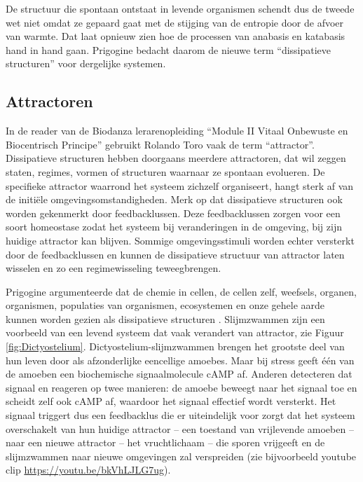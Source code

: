 \documentclass[
  11pt,
]{book}
\begin{document}
De structuur die spontaan ontstaat in levende organismen schendt dus de tweede wet niet omdat ze gepaard gaat met de stijging van de entropie door de afvoer van warmte. Dat laat opnieuw zien hoe de processen van anabasis en katabasis hand in hand gaan. Prigogine bedacht daarom de nieuwe term ``dissipatieve structuren'' voor dergelijke systemen.

\subsection{Attractoren}\label{attractoren}

In de reader van de Biodanza lerarenopleiding ``Module II Vitaal Onbewuste en Biocentrisch Principe'' gebruikt Rolando Toro vaak de term ``attractor''. Dissipatieve structuren hebben doorgaans meerdere attractoren, dat wil zeggen staten, regimes, vormen of structuren waarnaar ze spontaan evolueren. De specifieke attractor waarrond het systeem zichzelf organiseert, hangt sterk af van de initiële omgevingsomstandigheden. Merk op dat dissipatieve structuren ook worden gekenmerkt door feedbacklussen. Deze feedbacklussen zorgen voor een soort homeostase zodat het systeem bij veranderingen in de omgeving, bij zijn huidige attractor kan blijven. Sommige omgevingsstimuli worden echter versterkt door de feedbacklussen en kunnen de dissipatieve structuur van attractor laten wisselen en zo een regimewisseling teweegbrengen.

Prigogine argumenteerde dat de chemie in cellen, de cellen zelf, weefsels, organen, organismen, populaties van organismen, ecosystemen en onze gehele aarde kunnen worden gezien als dissipatieve structuren \citep{prigogineStengers1984}.
Slijmzwammen zijn een voorbeeld van een levend systeem dat vaak verandert van attractor, zie Figuur \ref{fig:Dictyostelium}. Dictyostelium-slijmzwammen brengen het grootste deel van hun leven door als afzonderlijke eencellige amoebes. Maar bij stress geeft één van de amoeben een biochemische signaalmolecule cAMP af. Anderen detecteren dat signaal en reageren op twee manieren: de amoebe beweegt naar het signaal toe en scheidt zelf ook cAMP af, waardoor het signaal effectief wordt versterkt. Het signaal triggert dus een feedbacklus die er uiteindelijk voor zorgt dat het systeem overschakelt van hun huidige attractor -- een toestand van vrijlevende amoeben -- naar een nieuwe attractor -- het vruchtlichaam -- die sporen vrijgeeft en de slijmzwammen naar nieuwe omgevingen zal verspreiden (zie bijvoorbeeld youtube clip \url{https://youtu.be/bkVhLJLG7ug}).
\end{document}
